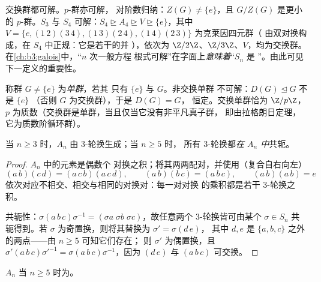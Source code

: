 \begin{example}\label{ex:b3:groups:solvableexamples}
交换群都可解。$p$-群亦可解，
对阶数归纳：$Z(G) \neq \{e\}$，且 $G/Z(G)$ 是更小的
$p$-群。$S_3$ 与 $S_4$ 可解：$S_4 \trianglerighteq A_4
\trianglerighteq V \trianglerighteq \{e\}$，其中 $V = \{e,
(1\,2)(3\,4), (1\,3)(2\,4), (1\,4)(2\,3)\}$ 为克莱因四元群（
由双对换构成，在 $S_4$ 中正规：它是若干的并
），依次为 $\Z/2\Z$、$\Z/3\Z$、$V$，均为交换群。
在\cref{ch:b3:galois}中，“$n$ 次一般方程
根式可解”在字面上\emph{意味着}“$S_n$ 是
”。由此可见下一定义的重要性。
\end{example}

\begin{definition}\label{def:b3:groups:simple}
称群 $G \neq \{e\}$ 为\emph{单群}，若其
只有 $\{e\}$ 与 $G$。非交换单群
不可解：$D(G) \trianglelefteq G$ 不是 $\{e\}$
（否则 $G$ 为交换群），于是 $D(G) = G$，
恒定。交换单群恰为 $\Z/p\Z$，$p$
为质数（交换群是单群，当且仅当它没有非平凡真子群，
即由拉格朗日定理，它为质数阶循环群）。
\end{definition}

\begin{lemma}\label{lem:b3:groups:threecycles}
当 $n \geq 3$ 时，$A_n$ 由 $3$-轮换生成；当 $n \geq 5$ 时，
所有 $3$-轮换都\emph{在 $A_n$ 中}共轭。
\end{lemma}

\begin{proof}
$A_n$ 中的元素是偶数个
对换之积；将其两两配对，并使用（复合自右向左）
\[
(a\,b)(c\,d) = (a\,c\,b)(a\,c\,d), \qquad
(a\,b)(b\,c) = (a\,b\,c), \qquad
(a\,b)(a\,b) = e
\]
依次对应不相交、相交与相同的对换对：每一对对换
的乘积都是若干 $3$-轮换之积。

共轭性：$\sigma(a\,b\,c)\sigma^{-1} = (\sigma a\; \sigma b\;
\sigma c)$，故任意两个 $3$-轮换皆可由某个 $\sigma \in
S_n$ 共轭得到。若 $\sigma$ 为奇置换，则将其替换为 $\sigma' = \sigma (d\,e)$，
其中 $d, e$ 是 $\{a, b, c\}$ 之外的两点——由 $n \geq 5$ 可知它们存在；
则 $\sigma'$ 为偶置换，且 $\sigma'(a\,b\,c)
\sigma'^{-1} = \sigma(a\,b\,c)\sigma^{-1}$，因为 $(d\,e)$ 与
$(a\,b\,c)$ 可交换。
\end{proof}

\begin{theorem}[交错群的单性]\label{thm:b3:groups:ansimple}
$A_n$ 当 $n \geq 5$ 时为。
\end{theorem}

